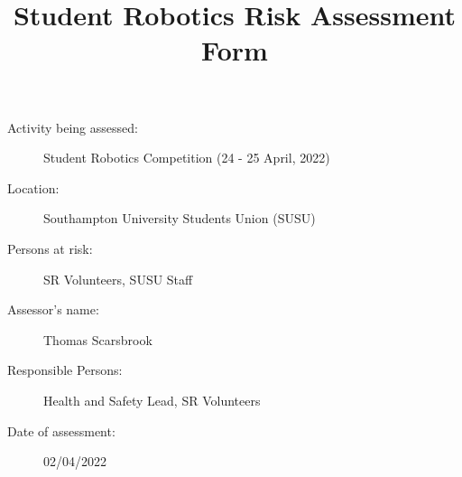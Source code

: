 \documentclass[12pt,a4paper]{scrartcl}
\title{Student Robotics Risk Assessment Form}
\begin{document}
\maketitle

\begin{description}
\item[Activity being assessed:] Student Robotics Competition (24 - 25 April, 2022)
\item[Location:] Southampton University Students Union (SUSU)
\item[Persons at risk:] SR Volunteers, SUSU Staff
\end{description}

\begin{description}
\item[Assessor's name:] Thomas Scarsbrook
\item[Responsible Persons:] Health and Safety Lead, SR Volunteers
\item[Date of assessment:] 02/04/2022
\end{description}
\clearpage

\renewcommand{\cellalign}{tl}
\renewcommand{\theadalign}{tl}

\newcommand{\risk}[4]{
	#1 & #2 & #3 & #4 \\
}
\end{document}
